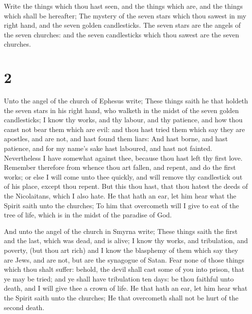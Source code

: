  Write the things which thou hast seen, and the things
which are, and the things which shall be hereafter;  The
mystery of the seven stars which thou sawest in my right hand, and the
seven golden candlesticks. The seven stars are the angels of the seven
churches: and the seven candlesticks which thou sawest are the seven
churches.

\hypertarget{section-1}{%
\section{2}\label{section-1}}

 Unto the angel of the church of Ephesus write; These
things saith he that holdeth the seven stars in his right hand, who
walketh in the midst of the seven golden candlesticks;  I
know thy works, and thy labour, and thy patience, and how thou canst not
bear them which are evil: and thou hast tried them which say they are
apostles, and are not, and hast found them liars:  And
hast borne, and hast patience, and for my name's sake hast laboured, and
hast not fainted.  Nevertheless I have somewhat against
thee, because thou hast left thy first love.  Remember
therefore from whence thou art fallen, and repent, and do the first
works; or else I will come unto thee quickly, and will remove thy
candlestick out of his place, except thou repent.  But
this thou hast, that thou hatest the deeds of the Nicolaitans, which I
also hate.  He that hath an ear, let him hear what the
Spirit saith unto the churches; To him that overcometh will I give to
eat of the tree of life, which is in the midst of the paradise of God.

 And unto the angel of the church in Smyrna write; These
things saith the first and the last, which was dead, and is alive;
 I know thy works, and tribulation, and poverty, (but thou
art rich) and I know the blasphemy of them which say they are Jews, and
are not, but are the synagogue of Satan.  Fear none of
those things which thou shalt suffer: behold, the devil shall cast some
of you into prison, that ye may be tried; and ye shall have tribulation
ten days: be thou faithful unto death, and I will give thee a crown of
life.  He that hath an ear, let him hear what the Spirit
saith unto the churches; He that overcometh shall not be hurt of the
second death.

